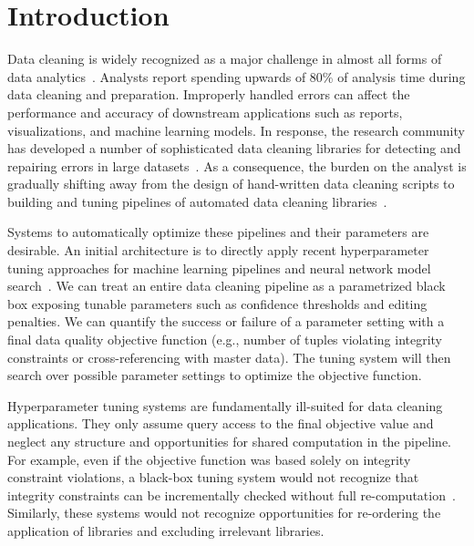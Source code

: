 \section{Introduction}\label{intro}\sloppy
Data cleaning is widely recognized as a major challenge in almost all forms of data analytics~\cite{nytimes}. 
Analysts report spending upwards of 80\% of analysis time during data cleaning and preparation.
Improperly handled errors can affect the performance and accuracy of downstream applications such as reports, visualizations, and machine learning models.
In response, the research community has developed a number of sophisticated data cleaning libraries for detecting and repairing errors in large datasets~\cite{dc, rekatsinas2017holoclean, DBLP:journals/pvldb/KrishnanWWFG16, DBLP:conf/sigmod/ChuIKW16, mudgal2018deep, doan2018toward}.
As a consequence, the burden on the analyst is gradually shifting away from the design of hand-written data cleaning scripts to building and tuning pipelines of automated data cleaning libraries~\cite{krishnan2016hilda}.

Systems to automatically optimize these pipelines and their parameters are desirable.
An initial architecture is to directly apply recent hyperparameter tuning approaches for machine learning pipelines and neural network model search~\cite{li2017hyperband, sparks2017keystoneml, baylor2017tfx, golovin2017google, liaw2018tune}.
We can treat an entire data cleaning pipeline as a parametrized black box exposing tunable parameters such as confidence thresholds and editing penalties. We can quantify the success or failure of a parameter setting with a final data quality objective function (e.g., number of tuples violating integrity constraints or cross-referencing with master data).
The tuning system will then search over possible parameter settings to optimize the objective function.


Hyperparameter tuning systems are fundamentally ill-suited for data cleaning applications.
They only assume query access to the final objective value and neglect any structure and opportunities for shared computation in the pipeline.
For example, even if the objective function was based solely on integrity constraint violations, a black-box tuning system would not recognize that integrity constraints can be incrementally checked without full re-computation~\cite{fan2014incremental}.
Similarly, these systems would not recognize opportunities for re-ordering the application of libraries and excluding irrelevant libraries.

